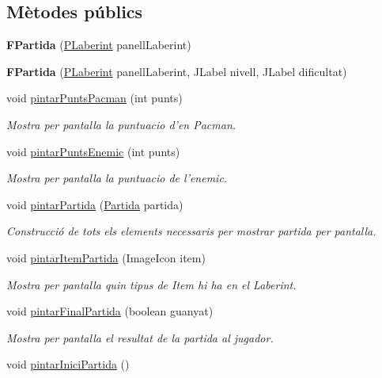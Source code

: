 \subsection*{Mètodes públics}
\begin{DoxyCompactItemize}
\item 
\hypertarget{classinterficie_1_1_f_partida_a6a73b8e78316fc26503ae3aaa9b1c646}{{\bfseries F\+Partida} (\hyperlink{classinterficie_1_1_p_laberint}{P\+Laberint} panell\+Laberint)}\label{classinterficie_1_1_f_partida_a6a73b8e78316fc26503ae3aaa9b1c646}

\item 
\hypertarget{classinterficie_1_1_f_partida_aa7a3a86dd6b54f400238ba43f57cee10}{{\bfseries F\+Partida} (\hyperlink{classinterficie_1_1_p_laberint}{P\+Laberint} panell\+Laberint, J\+Label nivell, J\+Label dificultat)}\label{classinterficie_1_1_f_partida_aa7a3a86dd6b54f400238ba43f57cee10}

\item 
void \hyperlink{classinterficie_1_1_f_partida_a2c19bf5a13e39dc3d48a87e121dd06db}{pintar\+Punts\+Pacman} (int punts)
\begin{DoxyCompactList}\small\item\em Mostra per pantalla la puntuacio d'en Pacman. \end{DoxyCompactList}\item 
void \hyperlink{classinterficie_1_1_f_partida_a5870ca61ba76baa48d77d57a8f063620}{pintar\+Punts\+Enemic} (int punts)
\begin{DoxyCompactList}\small\item\em Mostra per pantalla la puntuacio de l'enemic. \end{DoxyCompactList}\item 
void \hyperlink{classinterficie_1_1_f_partida_a52a4180cde3f2bd80e9bb635adca414c}{pintar\+Partida} (\hyperlink{classlogica_1_1_partida}{Partida} partida)
\begin{DoxyCompactList}\small\item\em Construcció de tots els elements necessaris per mostrar partida per pantalla. \end{DoxyCompactList}\item 
void \hyperlink{classinterficie_1_1_f_partida_a1430adb814777320b1d9f4860b717aae}{pintar\+Item\+Partida} (Image\+Icon item)
\begin{DoxyCompactList}\small\item\em Mostra per pantalla quin tipus de Item hi ha en el Laberint. \end{DoxyCompactList}\item 
void \hyperlink{classinterficie_1_1_f_partida_a3dc12aac71794744a5de495501af6281}{pintar\+Final\+Partida} (boolean guanyat)
\begin{DoxyCompactList}\small\item\em Mostra per pantalla el resultat de la partida al jugador. \end{DoxyCompactList}\item 
\hypertarget{classinterficie_1_1_f_partida_a38b42acd1d5586b0ae1472745ffb9d8b}{void \hyperlink{classinterficie_1_1_f_partida_a38b42acd1d5586b0ae1472745ffb9d8b}{pintar\+Inici\+Partida} ()}\label{classinterficie_1_1_f_partida_a38b42acd1d5586b0ae1472745ffb9d8b}


\end{DoxyCompactItemize}
